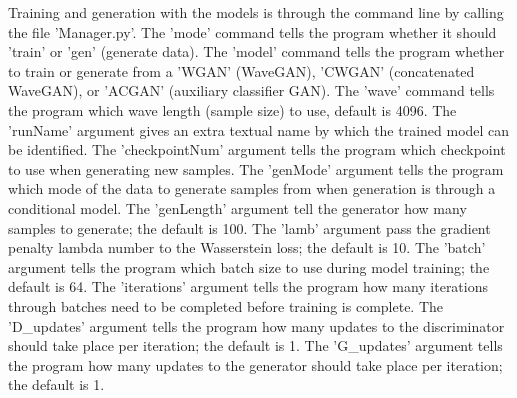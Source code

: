 \documentclass[a4paper, titlepage]{article}
\begin{document}
\begin{appendices}
  Training and generation with the models is through the command line by calling the file 'Manager.py'.
  \newline
  \newline
  The 'mode' command tells the program whether it should 'train' or 'gen' (generate data).
  \newline
  \newline
  The 'model' command tells the program whether to train or generate from a 'WGAN' (WaveGAN), 'CWGAN' (concatenated WaveGAN), or 'ACGAN' (auxiliary classifier GAN).
  \newline
  \newline
  The 'wave' command tells the program which wave length (sample size) to use, default is 4096.
  \newline
  \newline
  The 'runName' argument gives an extra textual name by which the trained model can be identified.
  \newline
  \newline
  The 'checkpointNum' argument tells the program which checkpoint to use when generating new samples.
  \newline
  \newline
  The 'genMode' argument tells the program which mode of the data to generate samples from when generation is through a conditional model.
  \newline
  \newline
  The 'genLength' argument tell the generator how many samples to generate; the default is 100.
  \newline
  \newline
  The 'lamb' argument pass the gradient penalty lambda number to the Wasserstein loss; the default is 10.
  \newline
  \newline
  The 'batch' argument tells the program which batch size to use during model training; the default is 64.
  \newline
  \newline
  The 'iterations' argument tells the program how many iterations through batches need to be completed before training is complete.
  \newline
  \newline
  The 'D\_updates' argument tells the program how many updates to the discriminator should take place per iteration; the default is 1.
  \newline
  \newline
  The 'G\_updates' argument tells the program how many updates to the generator should take place per iteration; the default is 1.

\end{appendices}
\end{document}
